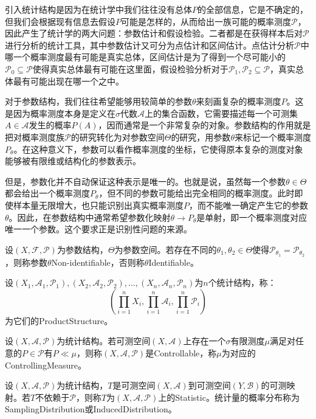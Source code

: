 \begin{note}
	引入统计结构是因为在统计学中我们往往没有总体$P$的全部信息，它是不确定的，但我们会根据现有信息去假设$P$可能是怎样的，从而给出一族可能的概率测度$\mathscr{P}$，因此产生了统计学的两大问题：参数估计和假设检验。二者都是在获得样本后对$\mathscr{P}$进行分析的统计工具，其中参数估计又可分为点估计和区间估计。点估计分析$\mathscr{P}$中哪一个概率测度最有可能是真实总体，区间估计是为了得到一个尽可能小的$\mathscr{P}_0\subseteq\mathscr{P}$使得真实总体最有可能在这里面，假设检验分析对于$\mathscr{P}_1,\mathscr{P}_2\subseteq\mathscr{P}$，真实总体最有可能出现在哪一个之中。\par
	对于参数结构，我们往往希望能够用较简单的参数$\theta$来刻画复杂的概率测度$P$。这是因为概率测度本身是定义在$\sigma$代数$\mathscr{A}$上的集合函数，它需要描述每一个可测集$A\in\mathscr{A}$发生的概率$P(A)$，因而通常是一个非常复杂的对象。参数结构的作用就是把对概率测度族$\mathscr{P}$的研究转化为对参数空间$\Theta$的研究，用参数$\theta$来标记一个概率测度$P_{\theta}$。在这种意义下，参数可以看作概率测度的坐标，它使得原本复杂的测度对象能够被有限维或结构化的参数表示。\par 
	但是，参数化并不自动保证这种表示是唯一的。也就是说，虽然每一个参数$\theta\in\Theta$都会给出一个概率测度$P_\theta$，但不同的参数可能给出完全相同的概率测度。此时即使样本量无限增大，也只能识别出真实概率测度$P$，而不能唯一确定产生它的参数$\theta$。因此，在参数结构中通常希望参数化映射$\theta\to P_\theta$是单射，即一个概率测度对应唯一一个参数。这个要求正是识别性问题的来源。
\end{note}
\begin{definition}
	设$(X,\mathscr{F},\mathscr{P})$为参数结构，$\Theta$为参数空间。若存在不同的$\theta_1,\theta_2\in\Theta$使得$\mathscr{P}_{\theta_1}=\mathscr{P}_{\theta_2}$，则称参数$\theta$\gls{Non-identifiable}，否则称$\theta$\gls{Identifiable}。
\end{definition}
\begin{definition}
	设$(X_1,\mathscr{A}_1,\mathscr{P}_1),(X_2,\mathscr{A}_2,\mathscr{P}_2),\dots,(X_n,\mathscr{A}_n,\mathscr{P}_n)$为$n$个统计结构，称：
	\begin{equation*}
		\left(\prod_{i=1}^nX_i,\prod_{i=1}^n\mathscr{A}_i,\prod_{i=1}^n\mathscr{P}_i\right)
	\end{equation*}
	为它们的\gls{ProductStructure}。
\end{definition}
\begin{definition}
	设$(X,\mathscr{A},\mathscr{P})$为统计结构。若可测空间$(X,\mathscr{A})$上存在一个$\sigma$有限测度$\mu$满足对任意的$P\in\mathscr{P}$有$P\ll\mu$，则称$(X,\mathscr{A},\mathscr{P})$是\gls{Controllable}，称$\mu$为对应的\gls{ControllingMeasure}。
\end{definition}
\begin{definition}
	设$(X,\mathscr{A},\mathscr{P})$为统计结构，$T$是可测空间$(X,\mathscr{A})$到可测空间$(Y,\mathscr{B})$的可测映射。若$T$不依赖于$\mathscr{P}$，则称$T$为$(X,\mathscr{A},\mathscr{P})$上的\gls{Statistic}。统计量的概率分布称为\gls{SamplingDistribution}或\gls{InducedDistribution}。
\end{definition}

